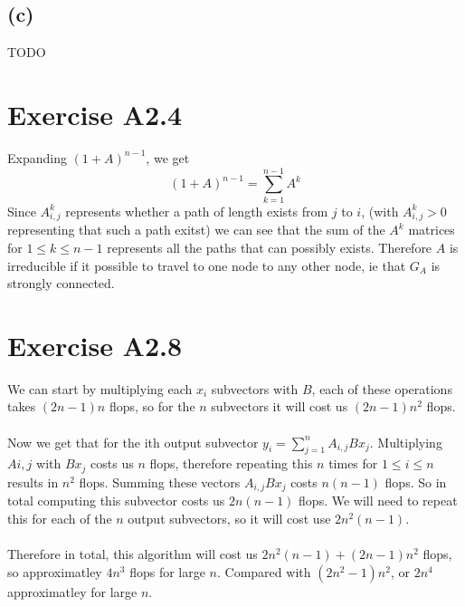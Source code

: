 \subsection*{(c)}
TODO
\section*{Exercise A2.4}
Expanding $(1+A)^{n-1}$, we get
$$
(1+A)^{n-1}=\sum_{k=1}^{n-1}A^k$$
Since $A^k_{i,j}$ represents whether a path of length exists from $j$ to $i$, (with $A^k_{i,j}>0$ representing that such a path exitst)
we can see that the sum of the $A^k$ matrices for $1\leq k \leq n-1$ represents all the paths that can possibly exists. Therefore $A$ is
irreducible if it possible to travel to one node to any other node, ie that $G_A$ is strongly connected.
\section*{Exercise A2.8}
We can start by multiplying each $x_i$ subvectors with $B$, each of these operations takes $(2n-1)n$ flops, so for the $n$ subvectors it will cost us $(2n-1)n^2$ flops.
\\\\Now we get that for the ith output subvector $y_i=\sum_{j=1}^{n}A_{i,j}Bx_j$. Multiplying $A{i,j}$ with $Bx_j$ costs us $n$ flops, therefore repeating this $n$ times for 
$1\leq i \leq n$ results in $n^2$ flops. Summing these vectors $A_{i,j}Bx_j$ costs $n(n-1)$ flops. So in total computing this subvector costs us $2n(n-1)$ flops. We will need to repeat this for each of the $n$ output subvectors, so it will cost use $2n^2(n-1)$.\\\\
Therefore in total, this algorithm will cost us $2n^2(n-1)+(2n-1)n^2$ flops, so approximatley $4n^3$ flops for large $n$. Compared with $(2n^2-1)n^2$, or $2n^4$ approximatley for large $n$.

